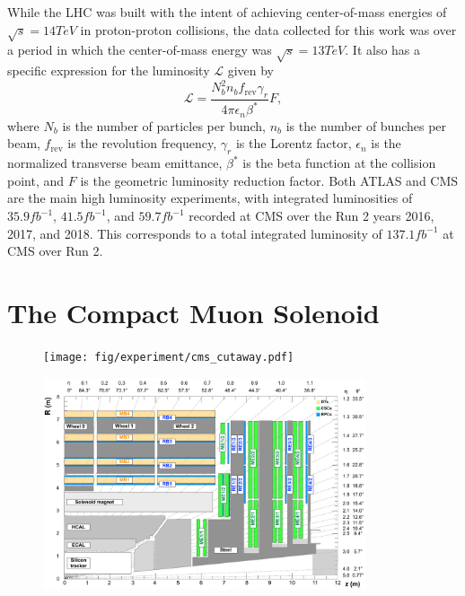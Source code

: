 While the LHC was built with the intent of achieving center-of-mass energies of $\sqrt{s}=14\unit{TeV}$ in proton-proton collisions, the data collected for this work was over a period in which the center-of-mass energy was $\sqrt{s}=13\unit{TeV}$.
It also has a specific expression for the luminosity $\mathcal{L}$ given by
\begin{equation}
  \mathcal{L}=\frac{N_b^2n_bf_\mathrm{rev}\gamma_r}{4\pi\epsilon_n\beta^*}F,
\end{equation}
where $N_b$ is the number of particles per bunch, $n_b$ is the number of bunches per beam, $f_\mathrm{rev}$ is the revolution frequency, $\gamma_r$ is the Lorentz factor, $\epsilon_n$ is the normalized transverse beam emittance, $\beta^*$ is the beta function at the collision point, and $F$ is the geometric luminosity reduction factor.
Both ATLAS and CMS are the main high luminosity experiments, with integrated luminosities of $35.9\unit{fb^{-1}}$, $41.5\unit{fb^{-1}}$, and $59.7\unit{fb^{-1}}$ recorded at CMS over the Run 2 years 2016, 2017, and 2018.
This corresponds to a total integrated luminosity of $137.1\unit{fb^{-1}}$ at CMS over Run 2.

\section{The Compact Muon Solenoid}
\label{sec:CMS}

\begin{figure}[htbp] %
  \centering
  \texttt{[image: fig/experiment/cms\_cutaway.pdf]}
  \caption{}
  \label{fig:CMSCut}
\end{figure}

\begin{figure}[htbp]
  \centering
  \includegraphics[width=0.85\textwidth]{fig/experiment/cms_crosssec.pdf}
  \caption{}
  \label{fig:CMSCrosssec}
\end{figure}

